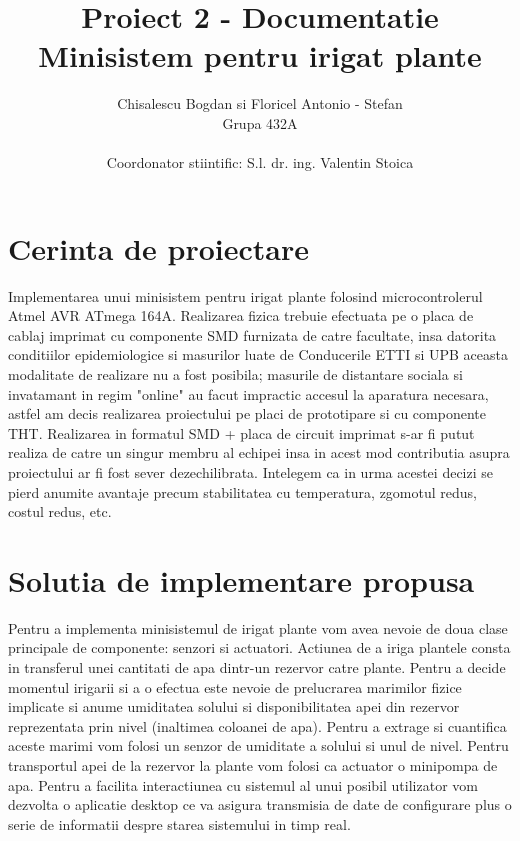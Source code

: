 \documentclass[12pt]{article}
\title{Proiect 2 - Documentatie \\ 
Minisistem pentru irigat plante}
\author{Chisalescu Bogdan si Floricel Antonio - Stefan \\
Grupa 432A \\ \\ Coordonator stiintific: S.l. dr. ing. Valentin Stoica}
\date{}
\begin{document}
\large
\maketitle
\newpage


\renewcommand*\contentsname{Cuprins}
\renewcommand{\cftsecleader}{\cftdotfill{\cftdotsep}}


\tableofcontents
\newpage


\section{Cerinta de proiectare}
\hspace{8 mm} Implementarea unui minisistem pentru irigat plante folosind microcontrolerul Atmel AVR ATmega 164A. Realizarea fizica trebuie efectuata pe o placa de cablaj imprimat cu componente SMD furnizata de catre facultate, insa datorita conditiilor epidemiologice si masurilor luate de Conducerile ETTI si UPB aceasta modalitate de realizare nu a fost posibila; masurile de distantare sociala si invatamant in regim "online" au facut impractic accesul la aparatura necesara, astfel am decis realizarea proiectului pe placi de prototipare si cu componente THT. Realizarea in formatul SMD + placa de circuit imprimat s-ar fi putut realiza de catre un singur membru al echipei insa in acest mod contributia asupra proiectului ar fi fost sever dezechilibrata. Intelegem ca in urma acestei decizi se pierd anumite avantaje precum stabilitatea cu temperatura, zgomotul redus, costul redus, etc.
\\

\section{Solutia de implementare propusa}
\hspace{8 mm} Pentru a implementa minisistemul de irigat plante  vom avea nevoie de doua clase principale de componente: senzori si actuatori. Actiunea de a iriga plantele consta in transferul unei cantitati de apa dintr-un rezervor catre plante. Pentru a decide momentul irigarii si a o efectua este nevoie de prelucrarea marimilor fizice implicate si anume umiditatea solului si disponibilitatea apei din rezervor reprezentata prin nivel (inaltimea coloanei de apa). Pentru a extrage si cuantifica aceste marimi vom folosi un senzor de umiditate a solului si unul de nivel. Pentru transportul apei de la rezervor la plante vom folosi ca actuator o minipompa de apa. Pentru a facilita interactiunea cu sistemul al unui posibil utilizator vom dezvolta o aplicatie desktop ce va asigura transmisia de date de configurare plus o serie de informatii despre starea sistemului in timp real.
\\
\end{document}
